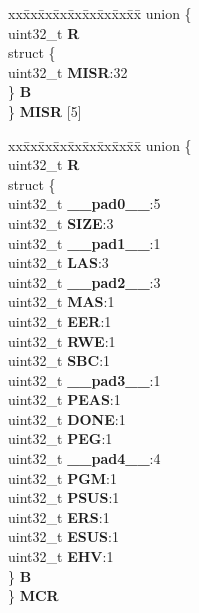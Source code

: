 \begin{DoxyCompactItemize}
\begin{tabbing}
\end{tabbing}\item 
\mbox{\label{structFLASH__tag_aa18b11458d3d629a3eefbbc165711d71}} 
\begin{tabbing}
xx\=xx\=xx\=xx\=xx\=xx\=xx\=xx\=xx\=\kill
union \{\\
\>uint32\_t {\bfseries R}\\
\>struct \{\\
\>\>uint32\_t {\bfseries MISR}:32\\
\>\} {\bfseries B}\\
\} {\bfseries MISR} \mbox{[}5\mbox{]}\\

\end{tabbing}\item 
\mbox{\label{structFLASH__tag_a0897a45cad79dc221806673c35bbcc57}} 
\begin{tabbing}
xx\=xx\=xx\=xx\=xx\=xx\=xx\=xx\=xx\=\kill
union \{\\
\>uint32\_t {\bfseries R}\\
\>struct \{\\
\>\>uint32\_t {\bfseries \_\_pad0\_\_}:5\\
\>\>uint32\_t {\bfseries SIZE}:3\\
\>\>uint32\_t {\bfseries \_\_pad1\_\_}:1\\
\>\>uint32\_t {\bfseries LAS}:3\\
\>\>uint32\_t {\bfseries \_\_pad2\_\_}:3\\
\>\>uint32\_t {\bfseries MAS}:1\\
\>\>uint32\_t {\bfseries EER}:1\\
\>\>uint32\_t {\bfseries RWE}:1\\
\>\>uint32\_t {\bfseries SBC}:1\\
\>\>uint32\_t {\bfseries \_\_pad3\_\_}:1\\
\>\>uint32\_t {\bfseries PEAS}:1\\
\>\>uint32\_t {\bfseries DONE}:1\\
\>\>uint32\_t {\bfseries PEG}:1\\
\>\>uint32\_t {\bfseries \_\_pad4\_\_}:4\\
\>\>uint32\_t {\bfseries PGM}:1\\
\>\>uint32\_t {\bfseries PSUS}:1\\
\>\>uint32\_t {\bfseries ERS}:1\\
\>\>uint32\_t {\bfseries ESUS}:1\\
\>\>uint32\_t {\bfseries EHV}:1\\
\>\} {\bfseries B}\\
\} {\bfseries MCR}\\


\end{tabbing}
\end{DoxyCompactItemize}
